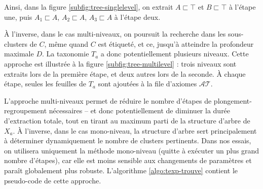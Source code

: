 Ainsi, dans la figure \ref{subfig:tree-singlelevel}, on extrait $A \sqsubset \top$ et $B \sqsubset \top$ à l'étape une, puis $A_1 \sqsubset A$, $A_2 \sqsubset A$, $A_3 \sqsubset A$ à l'étape deux.

À l'inverse, dans le cas multi-niveaux, on poursuit la recherche dans les sous-clusters de $C$, même quand $C$ est étiqueté, et ce, jusqu'à atteindre la profondeur maximale $D$. La taxonomie $T_a$ a donc potentiellement plusieurs niveaux. Cette approche est illustrée à la figure \ref{subfig:tree-multilevel} : trois niveaux sont extraits lors de la première étape, et deux autres lors de la seconde. À chaque étape, seules les feuilles de $T_a$ sont ajoutées à la file d'axiomes $\mathcal{AT}$.




L'approche multi-niveaux permet de réduire le nombre d'étapes de plongement-regroupement nécessaires – et donc potentiellement de diminuer la durée d'extraction totale, tout en tirant au maximum parti de la structure d'arbre de $X_a$. À l'inverse, dans le cas mono-niveau, la structure d'arbre sert principalement à déterminer dynamiquement le nombre de clusters pertinents. Dans nos essais, on utilisera uniquement la méthode mono-niveau (quitte à exécuter un plus grand nombre d'étapes), car elle est moins sensible aux changements de paramètres et paraît globalement plus robuste. L'algorithme \ref{algo:texp-trouve} contient le pseudo-code de cette approche.

